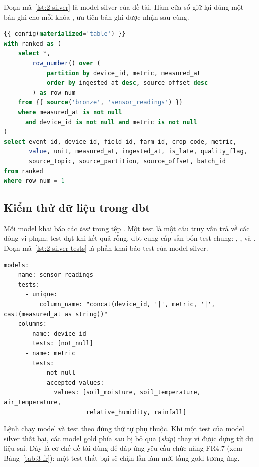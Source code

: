 Đoạn mã~\ref{lst:2-silver} là model silver của đề tài. Hàm cửa sổ  giữ lại đúng một bản ghi cho mỗi khóa , ưu tiên bản ghi được nhận sau cùng.

\begin{lstlisting}[language=SQL, caption={Model silver khử trùng lặp (rút gọn)}, label={lst:2-silver}]
{{ config(materialized='table') }}
with ranked as (
    select *,
        row_number() over (
            partition by device_id, metric, measured_at
            order by ingested_at desc, source_offset desc
        ) as row_num
    from {{ source('bronze', 'sensor_readings') }}
    where measured_at is not null
      and device_id is not null and metric is not null
)
select event_id, device_id, field_id, farm_id, crop_code, metric,
       value, unit, measured_at, ingested_at, is_late, quality_flag,
       source_topic, source_partition, source_offset, batch_id
from ranked
where row_num = 1
\end{lstlisting}

\subsection{Kiểm thử dữ liệu trong dbt}
\label{sec:2-dbt-tests}

Mỗi model khai báo các \emph{test} trong tệp . Một test là một câu truy vấn trả về các dòng vi phạm; test đạt khi kết quả rỗng. dbt cung cấp sẵn bốn test chung: , ,  và . Đoạn mã~\ref{lst:2-silver-tests} là phần khai báo test của model silver.

\begin{lstlisting}[caption={Test của model silver (rút gọn)}, label={lst:2-silver-tests}]
models:
  - name: sensor_readings
    tests:
      - unique:
          column_name: "concat(device_id, '|', metric, '|', cast(measured_at as string))"
    columns:
      - name: device_id
        tests: [not_null]
      - name: metric
        tests:
          - not_null
          - accepted_values:
              values: [soil_moisture, soil_temperature, air_temperature,
                       relative_humidity, rainfall]
\end{lstlisting}

Lệnh  chạy model và test theo đúng thứ tự phụ thuộc. Khi một test của model silver thất bại, các model gold phía sau bị bỏ qua (\emph{skip}) thay vì được dựng từ dữ liệu sai. Đây là cơ chế đề tài dùng để đáp ứng yêu cầu chức năng FR4.7 (xem Bảng~\ref{tab:3-fr}): một test thất bại sẽ chặn lần làm mới tầng gold tương ứng.


